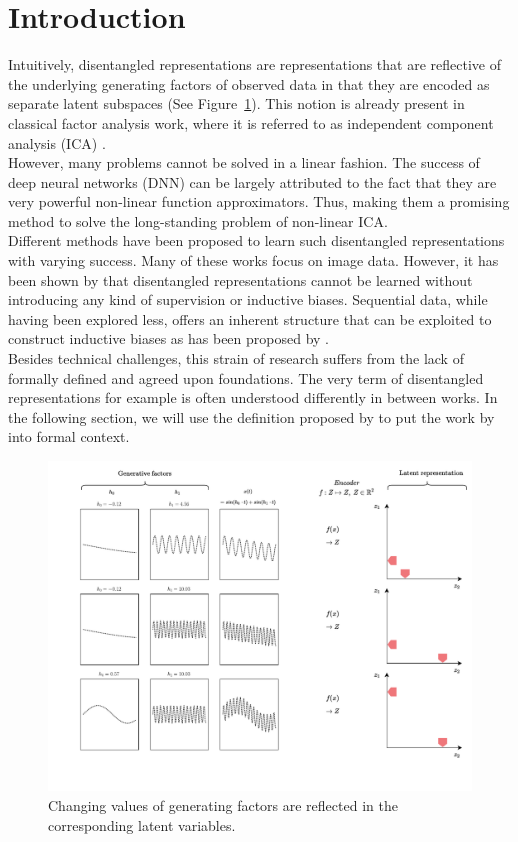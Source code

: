\documentclass{article} %
\begin{document}
\section*{Introduction}
Intuitively, disentangled representations are representations that are reflective of the underlying generating factors of observed data in that they are encoded as separate latent subspaces (See Figure~\ref{fig:intuition}). This notion is already present in classical factor analysis work, where it is referred to as independent component analysis (ICA) \cite{comon1992independent}.\\
However, many problems cannot be solved in a linear fashion. The success of deep neural networks (DNN) can be largely attributed to the fact that they are very powerful non-linear function approximators. Thus, making them a promising method to solve the long-standing problem of non-linear ICA.\\
Different methods have been proposed to learn such disentangled representations \cite{higgins2016beta, chen2016infogan, kulkarni2015deep} with varying success. Many of these works focus on image data. However, it has been shown by \citet{locatello2019challenging} that disentangled representations cannot be learned without introducing any kind of supervision or inductive biases. Sequential data, while having been explored less, offers an inherent structure that can be exploited to construct inductive biases as has been proposed by \citet{hsu2017unsupervised}.\\
Besides technical challenges, this strain of research suffers from the lack of formally defined and agreed upon foundations. The very term of disentangled representations for example is often understood differently in between works. In the following section, we will use the definition proposed by \citet{higgins2018towards} to put the work by \citet{hsu2017unsupervised} into formal context.

\begin{figure}
	\centering
	\includegraphics[width=.9\linewidth]{../figures/intution_3x3_static.pdf}
	\caption{Changing values of generating factors are reflected in the corresponding latent variables.}
	\label{fig:intuition}
\end{figure}
\end{document}
